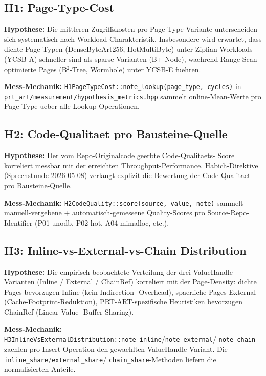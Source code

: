\subsection{H1: Page-Type-Cost}

\textbf{Hypothese:} Die mittleren Zugriffskosten pro Page-Type-Variante
unterscheiden sich systematisch nach Workload-Charakteristik. Insbesondere
wird erwartet, dass dichte Page-Typen (DenseByteArt256, HotMultiByte)
unter Zipfian-Workloads (YCSB-A) schneller sind als sparse Varianten
(B+-Node), waehrend Range-Scan-optimierte Pages (B$^2$-Tree, Wormhole)
unter YCSB-E fuehren.

\textbf{Mess-Mechanik:} \texttt{H1PageTypeCost::note\_lookup(page\_type,
cycles)} in \texttt{prt\_art/measurement/hypothesis\_metrics.hpp}
sammelt online-Mean-Werte pro Page-Type ueber alle Lookup-Operationen.

\subsection{H2: Code-Qualitaet pro Bausteine-Quelle}

\textbf{Hypothese:} Der vom Repo-Originalcode geerbte Code-Qualitaets-
Score korreliert messbar mit der erreichten Throughput-Performance.
Habich-Direktive (Sprechstunde 2026-05-08) verlangt explizit die
Bewertung der Code-Qualitaet pro Bausteine-Quelle.

\textbf{Mess-Mechanik:} \texttt{H2CodeQuality::score(source, value, note)}
sammelt manuell-vergebene + automatisch-gemessene Quality-Scores pro
Source-Repo-Identifier (P01-unodb, P02-hot, A04-mimalloc, etc.).

\subsection{H3: Inline-vs-External-vs-Chain Distribution}

\textbf{Hypothese:} Die empirisch beobachtete Verteilung der drei
ValueHandle-Varianten (Inline / External / ChainRef) korreliert mit
der Page-Density: dichte Pages bevorzugen Inline (kein Indirection-
Overhead), spaerliche Pages External (Cache-Footprint-Reduktion),
PRT-ART-spezifische Heuristiken bevorzugen ChainRef (Linear-Value-
Buffer-Sharing).

\textbf{Mess-Mechanik:}
\texttt{H3InlineVsExternalDistribution::note\_inline}/\texttt{note\_external}/
\texttt{note\_chain} zaehlen pro Insert-Operation den gewaehlten
ValueHandle-Variant. Die \texttt{inline\_share}/\texttt{external\_share}/
\texttt{chain\_share}-Methoden liefern die normalisierten Anteile.

